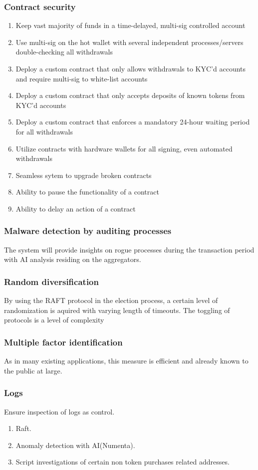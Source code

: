 \documentclass[]{article}
\begin{document}
		\subsubsection{Contract security}
		\begin{enumerate}
		\item Keep vast majority of funds in a time-delayed, multi-sig controlled account
		\item Use multi-sig on the hot wallet with several independent processes/servers double-checking all withdrawals
		\item Deploy a custom contract that only allows withdrawals to KYC'd accounts and require multi-sig to white-list accounts
		\item Deploy a custom contract that only accepts deposits of known tokens from KYC'd accounts
		\item Deploy a custom contract that enforces a mandatory 24-hour waiting period for all withdrawals
		\item Utilize contracts with hardware wallets for all signing, even automated withdrawals
		\item Seamless sytem to upgrade broken contracts
		\item Ability to pause the functionality of a contract 
		\item Ability to delay an action of a contract	
		\end{enumerate}
		\subsubsection{Malware detection by auditing processes}
		The system will provide insights on rogue processes during the transaction period with AI analysis residing on the aggregators. 
		\subsubsection{Random diversification}
		By using the RAFT protocol in the election process, a certain level of randomization is aquired with varying length of timeouts. The toggling of protocols is a level of 
		complexity 
		\subsubsection{Multiple factor identification}
		As in many existing applications, this measure is efficient and already known to the public at large.
		\subsubsection {Logs}
			Ensure inspection of logs as control.
			\begin{enumerate}
				\item Raft.
				\item Anomaly detection with AI(Numenta).
				\item Script investigations of certain non token purchases related addresses.
			\end{enumerate}
\end{document}
